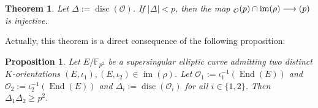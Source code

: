 \documentclass[a4paper,10pt,notitlepage]{report}
\theoremstyle{definition}
\theoremstyle{plain}
\newtheorem{Proposition}[Definition]{Proposition}
\newtheorem{Theorem}[Definition]{Theorem}
\theoremstyle{definition}
\newcommand{\F}{\mathbb{F}}
\newcommand{\mO}{\mathcal{O}}
\DeclareMathOperator{\im}{im}
\renewcommand{\(}{\left(}
\renewcommand{\)}{\right)}
\DeclareMathOperator{\End}{End}
\DeclareMathOperator{\disc}{disc}
\let\SS\relax
\DeclareMathOperator{\SS}{SS}
\begin{document}
\begin{Theorem}\label{Theorem 4}
Let $\Delta:=\disc(\mO)$. If $|\Delta|<p$, then the map $\SS_{\mO}(p)\cap\im(\rho)\longrightarrow\SS(p)$ is injective.
\end{Theorem}

Actually, this theorem is a direct consequence of the following proposition:

\begin{Proposition}\label{Proposition 7}
Let $E/\F_{p^2}$ be a supersingular elliptic curve admitting two distinct $K$-orientations $(E,\iota_1),(E,\iota_2)\in\im(\rho)$.  Let $\mO_1:=\iota_1^{-1}(\End(E))$ and $\mO_2:=\iota_2^{-1}(\End(E))$ and $\Delta_i:=\disc(\mO_i)$ for all $i\in\{1,2\}$.  Then $\Delta_1\Delta_2\geq p^2$.
\end{Proposition}
\end{document}
